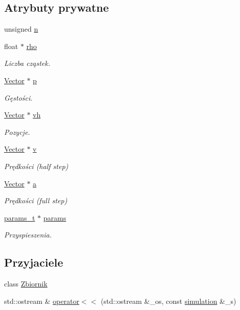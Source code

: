 \subsection*{Atrybuty prywatne}
\begin{DoxyCompactItemize}
\item 
unsigned \hyperlink{classsimulation_a22eb97765a5c60adf3d995f7a110da70}{n}
\item 
float $\ast$ \hyperlink{classsimulation_a44081d4edd92e17a3e1067b976031a00}{rho}
\begin{DoxyCompactList}\small\item\em Liczba cząstek. \end{DoxyCompactList}\item 
\hyperlink{class_vector}{Vector} $\ast$ \hyperlink{classsimulation_a5412fd01febe99f12ae38e30eb692ff0}{p}
\begin{DoxyCompactList}\small\item\em Gęstości. \end{DoxyCompactList}\item 
\hyperlink{class_vector}{Vector} $\ast$ \hyperlink{classsimulation_ae6da1f15728f49be7b0793700866ede9}{vh}
\begin{DoxyCompactList}\small\item\em Pozycje. \end{DoxyCompactList}\item 
\hyperlink{class_vector}{Vector} $\ast$ \hyperlink{classsimulation_a39dbad79b1b8667840638a35e839a3f7}{v}
\begin{DoxyCompactList}\small\item\em Prędkości (half step) \end{DoxyCompactList}\item 
\hyperlink{class_vector}{Vector} $\ast$ \hyperlink{classsimulation_a7b5ca0e5fc096989be7966a73c360b7f}{a}
\begin{DoxyCompactList}\small\item\em Prędkości (full step) \end{DoxyCompactList}\item 
\hyperlink{structparams__t}{params\+\_\+t} $\ast$ \hyperlink{classsimulation_a861b82cc3c0e7e58abfba464a133dae3}{params}
\begin{DoxyCompactList}\small\item\em Przyspieszenia. \end{DoxyCompactList}\end{DoxyCompactItemize}
\subsection*{Przyjaciele}
\begin{DoxyCompactItemize}
\item 
class \hyperlink{classsimulation_a444a8643309d19294860a4ae144137fe}{Zbiornik}
\item 
std\+::ostream \& \hyperlink{classsimulation_a1f6414b078a2823f5cea77fc1235e1d9}{operator$<$$<$} (std\+::ostream \&\+\_\+os, const \hyperlink{classsimulation}{simulation} \&\+\_\+s)
\end{DoxyCompactItemize}


